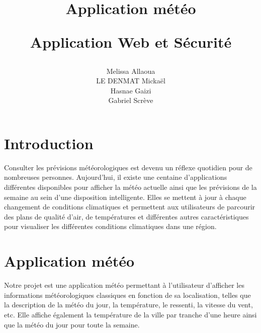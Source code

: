 \documentclass[12pt, french]{article}
\title{
	\Huge
	\textbf{Application météo}
	\vspace{0.4cm}

	\LARGE
	Application Web et Sécurité
}
\author{
	Melissa Allaoua \\
    LE DENMAT Mickaël \\
    Hasnae Gaizi \\
    Gabriel Scrève \\
}
\begin{document}
	
    \pagestyle{fancy} 
    \fancyhead[R]{\thepage}
    \fancyhead[C]{}
    \fancyfoot[C]{}
	\newpage
	\renewcommand{\contentsname}{Table des matières}
	\tableofcontents

	\newpage
	\section{Introduction}
	Consulter les prévisions météorologiques est devenu un réflexe quotidien pour de nombreuses personnes. Aujourd’hui, il existe une centaine d’applications différentes disponibles pour afficher la météo actuelle ainsi que les prévisions de la semaine au sein d’une disposition intelligente. Elles se mettent à jour à chaque changement de conditions climatiques et permettent aux utilisateurs de parcourir des plans de qualité d’air, de températures et différentes autres caractéristiques pour visualiser les différentes conditions climatiques dans une région.
	
	\section{Application météo}
		Notre projet est une application météo permettant à l'utilisateur d'afficher les informations météorologiques classiques en fonction de sa localisation, telles que
		la description de la météo du jour, la température,
		le ressenti, la vitesse du vent, etc. 
		Elle affiche également la température de la ville par tranche d'une heure ainsi que la météo du jour pour toute la semaine.
		
\end{document}
